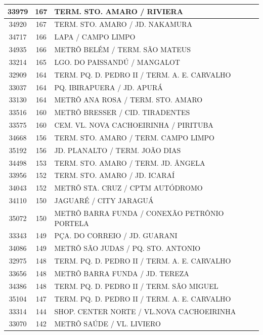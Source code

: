\documentclass[
	12pt,				%
	oneside,			%
	a4paper,			%
	english,			%
	brazil				%
	]{abntex2ppgsi}
\begin{document}
\begin{apendicesenv}
\begin{longtable}{c|c|p{7cm}}
\hline
    33979 & 167   & TERM. STO. AMARO / RIVIERA \\
\hline
    34920 & 167   & TERM. STO. AMARO / JD. NAKAMURA \\
\hline
    34717 & 166   & LAPA / CAMPO LIMPO \\
\hline
    34935 & 166   & METRÔ BELÉM / TERM. SÃO MATEUS \\
\hline
    33214 & 165   & LGO. DO PAISSANDÚ / MANGALOT \\
\hline
    32909 & 164   & TERM. PQ. D. PEDRO II / TERM. A. E. CARVALHO \\
\hline
    33037 & 164   & PQ. IBIRAPUERA / JD. APURÁ \\
\hline
    33130 & 164   & METRÔ ANA ROSA / TERM. STO. AMARO \\
\hline
    33516 & 160   & METRÔ BRESSER / CID. TIRADENTES \\
\hline
    33575 & 160   & CEM. VL. NOVA CACHOEIRINHA / PIRITUBA \\
\hline
    34668 & 156   & TERM. STO. AMARO / TERM. CAMPO LIMPO \\
\hline
    35192 & 156   & JD. PLANALTO / TERM. JOÃO DIAS \\
\hline
    34498 & 153   & TERM. STO. AMARO / TERM. JD. ÂNGELA \\
\hline
    33956 & 152   & TERM. STO. AMARO / JD. ICARAÍ \\
\hline
    34043 & 152   & METRÔ STA. CRUZ / CPTM AUTÓDROMO \\
\hline
    34110 & 150   & JAGUARÉ / CITY JARAGUÁ \\
\hline
    35072 & 150   & METRÔ BARRA FUNDA / CONEXÃO PETRÔNIO PORTELA \\
\hline
    33343 & 149   & PÇA. DO CORREIO / JD. GUARANI \\
\hline
    34086 & 149   & METRÔ SÃO JUDAS / PQ. STO. ANTONIO \\
\hline
    32975 & 148   & TERM. PQ. D. PEDRO II / TERM. A. E. CARVALHO \\
\hline
    33656 & 148   & METRÔ BARRA FUNDA / JD. TEREZA \\
\hline
    34386 & 148   & TERM. PQ. D. PEDRO II / TERM. SÃO MIGUEL \\
\hline
    35104 & 147   & TERM. PQ. D. PEDRO II / TERM. A. E. CARVALHO \\
\hline
    33314 & 144   & SHOP. CENTER NORTE / VL.NOVA CACHOEIRINHA \\
\hline
    33070 & 142   & METRÔ SAÚDE / VL. LIVIERO \\
\hline

\end{longtable}
\end{apendicesenv}
\end{document}
